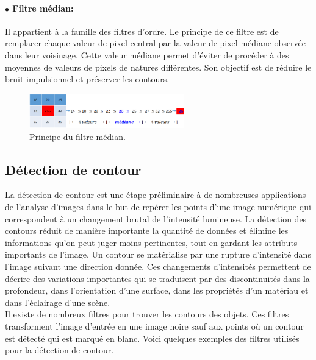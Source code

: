 \paragraph{ $\bullet$ Filtre médian:}
Il appartient à la famille des filtres d’ordre. Le principe de ce filtre est de remplacer chaque valeur de pixel central par la valeur de pixel médiane observée dans leur voisinage. Cette valeur médiane permet d’éviter de procéder à des moyennes de valeurs de pixels de natures différentes. Son objectif est de réduire le bruit impulsionnel et préserver les contours.
\begin{figure}[H]
	\centering
	\includegraphics[width=0.6\textwidth]{Figures/median} 
	\caption{Principe du filtre médian.}
\end{figure}

\subsection{Détection de contour}
La détection de contour est une étape préliminaire à de nombreuses
applications de l'analyse d'images dans le but de repérer les points d’une
image numérique qui correspondent à un changement brutal de l’intensité
lumineuse. La détection des contours réduit de manière importante la
quantité de données et élimine les informations qu'on peut juger moins
pertinentes, tout en gardant les attributs importants de l'image.
Un contour se matérialise par une rupture d'intensité dans l'image
suivant une direction donnée. Ces changements d’intensités permettent de
décrire des variations importantes qui se traduisent par des discontinuités
dans la profondeur, dans l'orientation d'une surface, dans les propriétés
d'un matériau et dans l'éclairage d'une scène.\\

Il existe de nombreux filtres pour trouver les contours des objets. Ces filtres transforment l'image d'entrée en une image noire sauf aux points où un contour est détecté qui est marqué en blanc. Voici quelques exemples des filtres utilisés pour la détection de contour.

